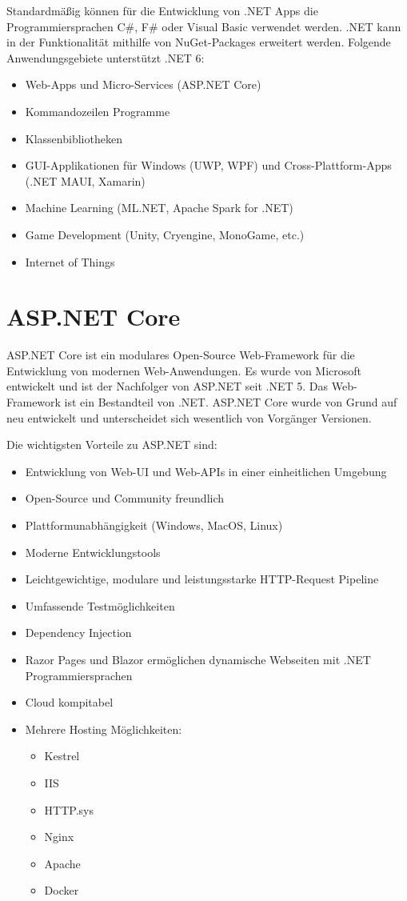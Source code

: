 Standardmäßig können für die Entwicklung von .NET Apps die Programmiersprachen C\#, F\# oder Visual Basic verwendet werden. 
.NET kann in der Funktionalität mithilfe von NuGet-Packages erweitert werden. Folgende Anwendungsgebiete unterstützt .NET 6:
\begin{itemize}
    \item Web-Apps und Micro-Services (ASP.NET Core)
    \item Kommandozeilen Programme
    \item Klassenbibliotheken
    \item GUI-Applikationen für Windows (UWP, WPF) und Cross-Plattform-Apps (.NET MAUI, Xamarin)
    \item Machine Learning (ML.NET, Apache Spark for .NET)
    \item Game Development (Unity, Cryengine, MonoGame, etc.)
    \item Internet of Things
\end{itemize}

\newpage
\section{ASP.NET Core}
\cite{ASPNETCoreDocumentation}
\cite{RazorPagesITVision}
\cite{ASPNETCoreWikipedia}

ASP.NET Core ist ein modulares Open-Source Web-Framework für die Entwicklung von modernen Web-Anwendungen.
Es wurde von Microsoft entwickelt und ist der Nachfolger von ASP.NET seit .NET 5. Das Web-Framework ist ein Bestandteil von 
.NET. ASP.NET Core wurde von Grund auf neu entwickelt und unterscheidet sich wesentlich von Vorgänger Versionen. 

Die wichtigsten Vorteile zu ASP.NET sind:
\begin{itemize}
    \item Entwicklung von Web-UI und Web-APIs in einer einheitlichen Umgebung
    \item Open-Source und Community freundlich
    \item Plattformunabhängigkeit (Windows, MacOS, Linux)
    \item Moderne Entwicklungstools
    \item Leichtgewichtige, modulare und leistungsstarke HTTP-Request Pipeline
    \item Umfassende Testmöglichkeiten
    \item Dependency Injection
    \item Razor Pages und Blazor ermöglichen dynamische Webseiten mit .NET Programmiersprachen
    \item Cloud kompitabel
    \item Mehrere Hosting Möglichkeiten:
    \begin{itemize}
        \item Kestrel
        \item IIS
        \item HTTP.sys
        \item Nginx
        \item Apache
        \item Docker
    \end{itemize}
\end{itemize}

